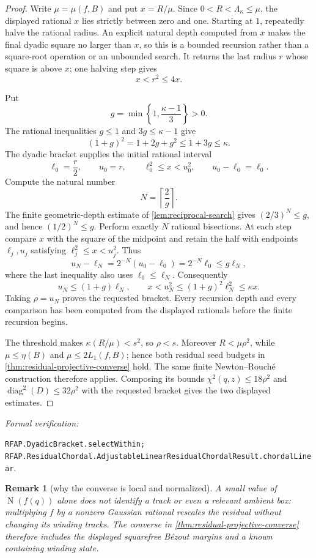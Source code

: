 \documentclass[11pt]{article}
\newtheorem{remark}[theorem]{Remark}
\newcommand{\Norm}[1]{\operatorname{N}\!\left(#1\right)}
\newcommand{\diamq}{\operatorname{diag}^{2}}
\newcommand{\leanref}[1]{\par\smallskip\noindent
  \emph{Formal verification:}\par\nobreak
  {\raggedright\nolinkurl{#1}.\par}}
\begin{document}
\begin{proof}
Write $\mu=\mu(f,B)$ and put $x=R/\mu$.  Since
$0<R<\Lambda_\kappa\le\mu$, the displayed
rational $x$ lies strictly between zero and one.  Starting at $1$, repeatedly
halve the rational radius.  An explicit natural depth computed from $x$ makes the
final dyadic square no larger than $x$, so this is a bounded recursion rather
than a square-root operation or an unbounded search.  It returns the last
radius $r$ whose square is above $x$; one halving step gives
\[
                         x<r^2\le4x.
\]

Put
\[
              g=\min\left\{1,\frac{\kappa-1}{3}\right\}>0.
\]
The rational inequalities $g\le1$ and $3g\le\kappa-1$ give
\[
              (1+g)^2=1+2g+g^2\le1+3g\le\kappa.
\]
The dyadic bracket supplies the initial rational interval
\[
 \ell_0=\frac r2,\qquad u_0=r,\qquad
 \ell_0^2\le x<u_0^2,\qquad u_0-\ell_0=\ell_0.
\]
Compute the natural number
\[
             N=\left\lceil\frac2g\right\rceil.
\]
The finite geometric-depth estimate of \cref{lem:reciprocal-search} gives
$(2/3)^N\le g$, and hence $(1/2)^N\le g$.  Perform exactly $N$ rational
bisections.  At each step compare $x$ with the square of the midpoint and
retain the half with endpoints $\ell_j,u_j$ satisfying
$\ell_j^2\le x<u_j^2$.  Thus
\[
 u_N-\ell_N
   =2^{-N}(u_0-\ell_0)
   =2^{-N}\ell_0
   \le g\ell_N,
\]
where the last inequality also uses $\ell_0\le\ell_N$.  Consequently
\[
 u_N\le(1+g)\ell_N,
 \qquad
 x<u_N^2\le(1+g)^2\ell_N^2\le\kappa x.
\]
Taking $\rho=u_N$ proves the requested bracket.  Every recursion depth and
every comparison has been computed from the displayed rationals before the
finite recursion begins.

The threshold makes $\kappa(R/\mu)<s^2$, so $\rho<s$.  Moreover
$R<\mu\rho^2$, while $\mu\le\eta(B)$ and
$\mu\le2L_1(f,B)$; hence both residual seed budgets in
\cref{thm:residual-projective-converse} hold.  The same finite
Newton--Rouch\'e construction therefore applies.  Composing its bounds
$\chi^2(q,z)\le18\rho^2$ and $\diamq(D)\le32\rho^2$ with the requested
bracket gives the two displayed estimates.
\end{proof}

\leanref{RFAP.DyadicBracket.selectWithin;
RFAP.ResidualChordal.AdjustableLinearResidualChordalResult.chordalLinear}

\begin{remark}[why the converse is local and normalized]
A small value of $\Norm{f(q)}$ alone does not identify a track or even a
relevant ambient box: multiplying $f$ by a nonzero Gaussian rational rescales
the residual without changing its winding tracks.  The converse in
\cref{thm:residual-projective-converse} therefore includes the displayed
squarefree Bézout margins and a known containing winding state.
\end{remark}
\end{document}
